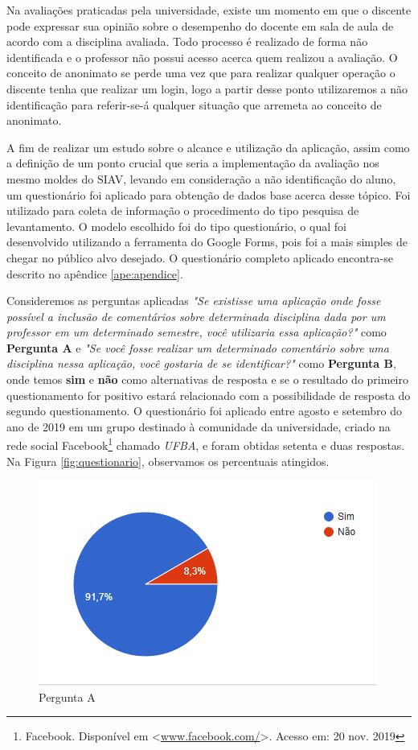 \documentclass[12pt, a4paper]{report}
\begin{document}
Na avaliações praticadas pela universidade, existe um momento em que o discente pode expressar sua opinião sobre o desempenho do docente em sala de aula de acordo com a disciplina avaliada. Todo processo é realizado de forma não identificada e o professor não possui acesso acerca quem realizou a avaliação. O conceito de anonimato se perde uma vez que para realizar qualquer operação o discente tenha que realizar um login, logo a partir desse ponto utilizaremos a não identificação para referir-se-á qualquer situação que arremeta ao conceito de anonimato.

A fim de realizar um estudo sobre o alcance e utilização da aplicação, assim como a definição de um ponto crucial que seria a implementação da avaliação nos mesmo moldes do \ac{SIAV}, levando em consideração a não identificação do aluno, um questionário foi aplicado para obtenção de dados base acerca desse tópico. 
Foi utilizado para coleta de informação o procedimento do tipo pesquisa de levantamento. O modelo escolhido foi do tipo questionário, o qual foi desenvolvido utilizando a ferramenta do Google Forms, pois foi a mais simples de chegar no público alvo desejado. O questionário completo aplicado encontra-se descrito no apêndice \ref{ape:apendice}.

Consideremos as perguntas aplicadas \textit{"Se existisse uma aplicação onde fosse possível a inclusão de comentários sobre determinada disciplina dada por um professor em um determinado semestre, você utilizaria essa aplicação?"} como \textbf{Pergunta A} e \textit{ 
"Se você fosse realizar um determinado comentário sobre uma disciplina nessa aplicação, você gostaria de se identificar?"} como \textbf{Pergunta B}, onde temos \textbf{sim} e \textbf{não} como alternativas de resposta e se o resultado do primeiro  questionamento for positivo estará relacionado com a possibilidade de resposta do segundo questionamento. O questionário foi aplicado entre agosto e setembro do ano de 2019 em um grupo destinado à comunidade da universidade, criado na rede social Facebook\footnote{Facebook. Disponível em <\url{www.facebook.com/}>. Acesso em: 20 nov. 2019} chamado \textit{UFBA}, e foram obtidas setenta e duas respostas. Na Figura \ref{fig:questionario}, observamos os percentuais atingidos.

\begin{figure}
\centering
\includegraphics[scale=0.8]{pergunta_a.png}
\caption{Pergunta A}
\label{fig:pergunta_a}
\end{figure}
\end{document}
